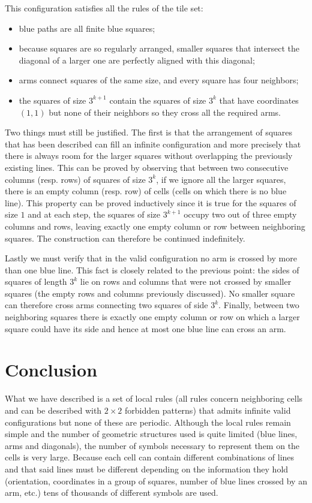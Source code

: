 \documentclass{jac}
\begin{document}
This configuration satisfies all the rules of the tile set:
\begin{itemize}
	\item blue paths are all finite blue squares;
	\item because squares are so regularly arranged, smaller squares that intersect the diagonal of a larger one are perfectly aligned with this diagonal;
	\item arms connect squares of the same size, and every square has four neighbors;
	\item the squares of size $3^{k+1}$ contain the squares of size $3^k$ that have coordinates $(1,1)$ but none of their neighbors so they cross all the required arms.
\end{itemize}

Two things must still be justified. The first is that the arrangement of squares that has been described can fill an infinite configuration and more precisely that there is always room for the larger squares without overlapping the previously existing lines. This can be proved by observing that between two consecutive columns (resp. rows) of squares of size $3^k$, if we ignore all the larger squares, there is an empty column (resp. row) of cells (cells on which there is no blue line). This property can be proved inductively since it is true for the squares of size $1$ and at each step, the squares of size $3^{k+1}$ occupy two out of three empty columns and rows, leaving exactly one empty column or row between neighboring squares. The construction can therefore be continued indefinitely.

Lastly we must verify that in the valid configuration no arm is crossed by more than one blue line. This fact is closely related to the previous point: the sides of squares of length $3^k$ lie on rows and columns that were not crossed by smaller squares (the empty rows and columns previously discussed). No smaller square can therefore cross arms connecting two squares of side $3^k$. Finally, between two neighboring squares there is exactly one empty column or row on which a larger square could have its side and hence at most one blue line can cross an arm.


\section{Conclusion} \label{sec:conclusion}

What we have described is a set of local rules (all rules concern neighboring cells and can be described with $2\times 2$ forbidden patterns) that admits infinite valid configurations but none of these are periodic. Although the local rules remain simple and the number of geometric structures used is quite limited (blue lines, arms and diagonals), the number of symbols necessary to represent them on the cells is very large. Because each cell can contain different combinations of lines and that said lines must be different depending on the information they hold (orientation, coordinates in a group of squares, number of blue lines crossed by an arm, etc.) tens of thousands of different symbols are used.
\end{document}
